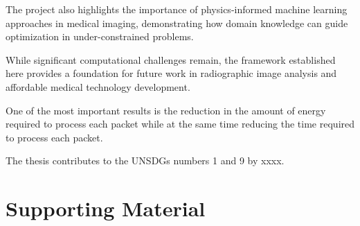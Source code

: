 \documentclass[nomenclature, english, bibtex]{kththesis}
\newcommand*{\warningExpl}[1]{\todo[inline, backgroundcolor=kth-lightred40]{#1}} %
\numberwithin{listing}{chapter}
\begin{document}
The project also highlights the importance of physics-informed machine learning approaches in medical imaging, demonstrating how domain knowledge can guide optimization in under-constrained problems.

While significant computational challenges remain, the framework established here provides a foundation for future work in radiographic image analysis and affordable medical technology development.


One of the most important results is the reduction in the amount of
energy required to process each packet while at the same time reducing the
time required to process each packet.

The thesis contributes to the \gls{UN}\enspace\glspl{SDG} numbers 1 and 9 by
xxxx.



\cleardoublepage
\renewcommand{\bibname}{References}


\ifbiblatex
    \printbibliography[heading=bibintoc]
\else
    
\fi



\appendix
\renewcommand{\chaptermark}[1]{\markboth{Appendix \thechapter\relax:\thinspace\relax#1}{}}
\chapter{Supporting Material}
\end{document}
